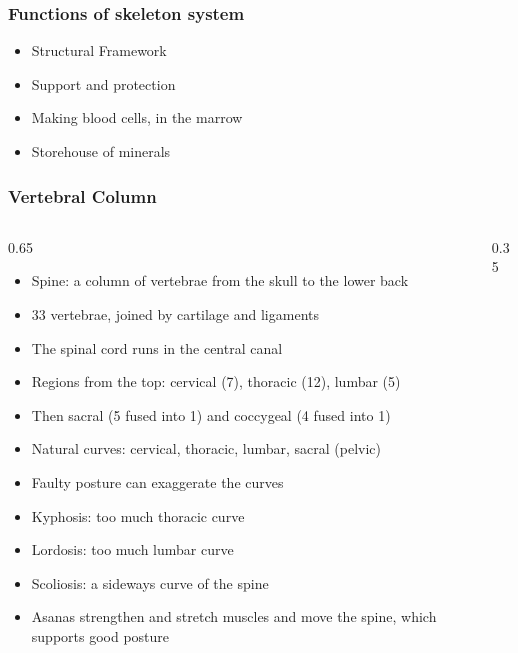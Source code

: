 \begin{frame}[fragile]\frametitle{Functions of skeleton system}

\begin{itemize}
\item Structural Framework
\item Support and protection
\item Making blood cells, in the marrow
\item Storehouse of minerals
\end{itemize}
	  
\end{frame}


\begin{frame}[fragile]\frametitle{Vertebral Column}
\begin{columns}
    \begin{column}[T]{0.65\linewidth}
      \begin{itemize}
		\item Spine: a column of vertebrae from the skull to the lower back
		\item 33 vertebrae, joined by cartilage and ligaments
		\item The spinal cord runs in the central canal
		\item Regions from the top: cervical (7), thoracic (12), lumbar (5)
		\item Then sacral (5 fused into 1) and coccygeal (4 fused into 1)
		\item Natural curves: cervical, thoracic, lumbar, sacral (pelvic)
		\item Faulty posture can exaggerate the curves
		\item Kyphosis: too much thoracic curve
		\item Lordosis: too much lumbar curve
		\item Scoliosis: a sideways curve of the spine
		\item Asanas strengthen and stretch muscles and move the spine, which supports good posture
	  \end{itemize}
    \end{column}
    \begin{column}[T]{0.35\linewidth}
		\begin{center}

\end{center}
\end{column}
\end{columns}
\end{frame}
